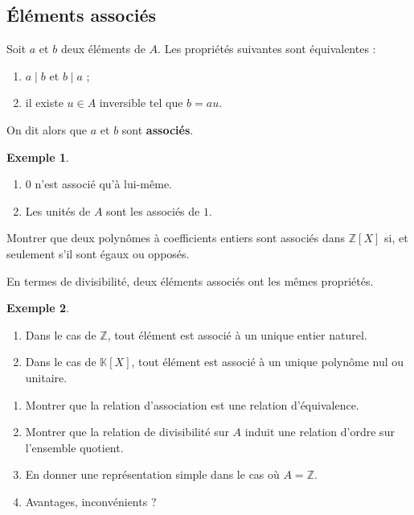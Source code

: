 \documentclass[french]{article}
\newcommand{\Z}{\mathbb{Z}}
\newcommand{\K}{\mathbb{K}}
\theoremstyle{plain}
\theoremstyle{definition}
\newtheorem*{ex}{Exemple}
\theoremstyle{remark}
\begin{document}
\subsection{Éléments associés}

\begin{prop}%
	Soit $a$ et $b$ deux éléments de $A$. Les propriétés suivantes sont équivalentes :
	\begin{enumerate}[label=(\roman*)]
		\item $a\mid b$ et $b\mid a$ ;
		\item il existe $u\in A$ inversible tel que $b=au$.
	\end{enumerate}
	On dit alors que $a$ et $b$ sont \textbf{associés}.
\end{prop}

\begin{ex}
	\begin{enumerate}
		\item $0$ n'est associé qu'à lui-même.
		\item Les unités de $A$ sont les associés de $1$.
	\end{enumerate}
\end{ex}

\begin{exo}
	Montrer que deux polynômes à coefficients entiers sont associés dans $\Z[X]$ si, et seulement s'il sont égaux ou opposés.
\end{exo}

\begin{met}
	En termes de divisibilité, deux éléments associés ont les mêmes propriétés.
\end{met}

\begin{ex}
	\begin{enumerate}
		\item Dans le cas de $\Z$, tout élément est associé à un unique entier naturel.
		\item Dans le cas de $\K[X]$, tout élément est associé à un unique polynôme nul ou unitaire.
	\end{enumerate}
\end{ex}

\begin{exo}
	\begin{enumerate}
		\item Montrer que la relation d'association est une relation d'équivalence.
		\item Montrer que la relation de divisibilité sur $A$ induit une relation d'ordre sur l'ensemble quotient.
		\item En donner une représentation simple dans le cas où $A=\Z$.
		\item Avantages, inconvénients ?
	\end{enumerate}
\end{exo}
\end{document}
